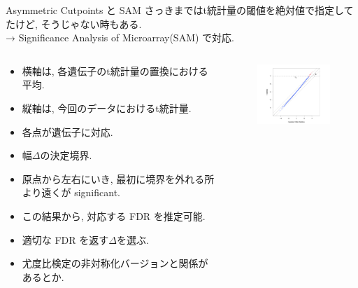 \documentclass[dvipdfmx,8pt]{beamer}
\begin{document}
  \begin{frame}{Asymmetric Cutpoints と SAM}
    さっきまではt統計量の閾値を絶対値で指定してたけど, そうじゃない時もある. \\
    → Significance Analysis of Microarray(SAM) で対応.
    \begin{columns}
      \begin{column}{0.5\columnwidth}
        \begin{itemize}
          \item 横軸は, 各遺伝子のt統計量の置換における平均. 
          \item 縦軸は, 今回のデータにおけるt統計量. 
          \item 各点が遺伝子に対応.
          \item 幅$\Delta$の決定境界.
          \item 原点から左右にいき, 最初に境界を外れる所より遠くが significant.
          \item この結果から, 対応する FDR を推定可能. 
          \item 適切な FDR を返す$\Delta$を選ぶ.
          \item 尤度比検定の非対称化バージョンと関係があるとか.
        \end{itemize}
      \end{column}
      \begin{column}{0.5\columnwidth}
        \begin{figure}[htb]
          \centering
          \includegraphics[width=5cm]{./images/sam-plot-t.png}
        \end{figure}
      \end{column}
    \end{columns}
  \end{frame}
\end{document}
